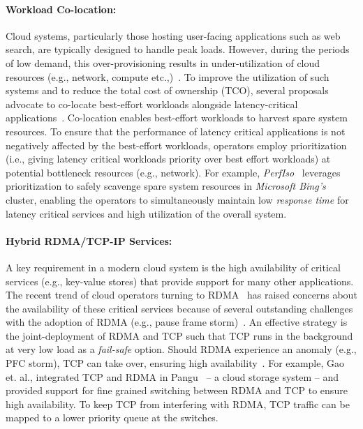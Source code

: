 \paragraph{\textbf{Workload Co-location:}}
Cloud systems, particularly those hosting user-facing applications such as web search, are typically designed to handle peak loads. 
However, during the periods of low demand, this over-provisioning results in under-utilization of cloud resources (e.g., network, compute etc.,)~\cite{low-util-google-borg,low-util-google,low-util-twitter-quasar,low-util-dc-comp,wl-col-ali-elsticity}.
To improve the utilization of such systems and to reduce the total cost of ownership (TCO), several proposals advocate to co-locate best-effort workloads alongside latency-critical applications~\cite{heracles,bistro,wl-col-ali-elsticity,wl-col-ms-harvest,perfIso}. Co-location enables best-effort workloads to harvest spare system resources.
To ensure that the performance of latency critical applications is not negatively affected by the best-effort workloads, operators employ prioritization (i.e., giving latency critical workloads priority over best effort workloads) at potential bottleneck resources (e.g., network).
For example, \emph{PerfIso}~\cite{perfIso} leverages prioritization to safely scavenge spare system resources in \emph{Microsoft Bing's} cluster, enabling the operators to simultaneously maintain low \emph{response time} for latency critical services and high utilization of the overall system.

\paragraph{\textbf{Hybrid RDMA/TCP-IP Services:}}
A key requirement in a modern cloud system is the high availability of critical services (e.g., key-value stores) that provide support for many other applications.
The recent trend of cloud operators turning to RDMA~\cite{hpcc,dcqcn,timely,pangu,mp-rdma} has raised concerns about the availability of these critical services because of several outstanding challenges with the adoption of RDMA (e.g., pause frame storm)~\cite{collie,pangu,gentle-flow-control,deadlock-in-datacenter}.
An effective strategy is the joint-deployment of RDMA and TCP such that TCP runs in the background at very low load as a \textit{fail-safe} option.
Should RDMA experience an anomaly (e.g., PFC storm), TCP can take over, ensuring high availability~\cite{pangu,accelnet,brpc}.
For example, Gao et. al., integrated TCP and RDMA in Pangu~\cite{pangu} -- a cloud storage system -- and provided support for fine grained switching between RDMA and TCP to ensure high availability.
To keep TCP from interfering with RDMA, TCP traffic can be mapped to a lower priority queue at the switches.


